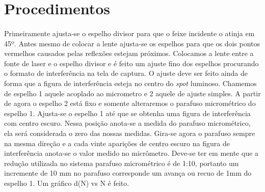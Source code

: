 \documentclass[a4paper,11pt]{article}
\begin{document}
\newpage
\section{Procedimentos}
\paragraph{} Primeiramente ajusta-se o espelho divisor para que o feixe incidente o atinja em 45º.
Antes mesmo de colocar a lente ajusta-se os espelhos para que os dois pontos vermelhos causados pelas reflexões estejam
próximos. Colocamos a lente entre a fonte de laser e o espelho divisor e é feito um ajuste fino dos espelhos
procurando o formato de interferência na tela de captura. O ajuste deve ser feito ainda
de forma que a figura de interferência esteja no centro do \emph{spot} luminoso. Chamemos de espelho 1 aquele acoplado ao micrometro e 2 aquele de ajuste simples. A partir de agora o espelho 2 está fixo
e somente alteraremos o parafuso micrométrico do espelho 1. Ajusta-se o espelho 1 até que se obtenha uma figura de interferência
com centro escuro.  Nessa posição anota-se a medida do parafuso micrométrico, ela será considerada o zero das nossas medidas. 
Gira-se agora o parafuso sempre na mesma direção e a cada vinte aparições de centro escuro na figura de interferência anota-se
o valor medido no micrômetro. Deve-se ter em mente que a redução utilizada no sistema parafuso micrométrico é de 1:10, portanto
um incremente de 10 mm no parafuso corresponde um avança ou recuo de 1mm do espelho 1. Um gráfico d(N) vs N é feito. 
\end{document}
